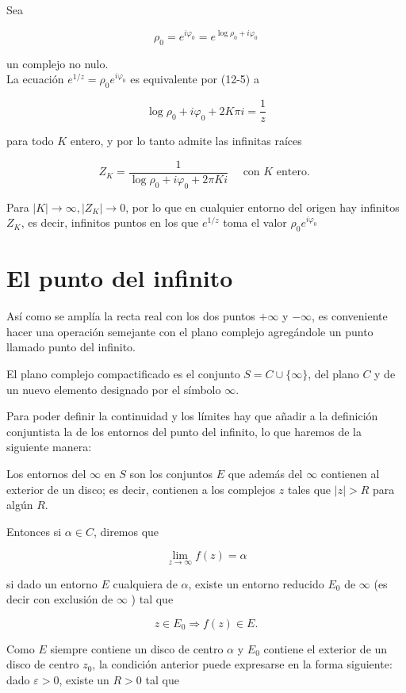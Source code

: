 \documentclass[10pt]{article}
\theoremstyle{plain}
\theoremstyle{definition}
\theoremstyle{remark}
\begin{document}
Sea

$$
\rho_{0}=e^{i \varphi_{0}}=e^{\log \rho_{0}+i \varphi_{0}}
$$

un complejo no nulo.\\
La ecuación $e^{1 / z}=\rho_{0} e^{i \varphi_{0}}$ es equivalente por (12-5) a

$$
\log \rho_{0}+i \varphi_{0}+2 K \pi i=\frac{1}{z}
$$

para todo $K$ entero, y por lo tanto admite las infinitas raíces

$$
Z_{K}=\frac{1}{\log \rho_{0}+i \varphi_{0}+2 \pi K i} \quad \text { con } K \text { entero. }
$$

Para $|K| \rightarrow \infty,\left|Z_{K}\right| \rightarrow 0$, por lo que en cualquier entorno del origen hay infinitos $Z_{K}$, es decir, infinitos puntos en los que $e^{1 / z}$ toma el valor $\rho_{0} e^{i \varphi_{0}}$

\section{El punto del infinito}
Así como se amplía la recta real con los dos puntos $+\infty$ y $-\infty$, es conveniente hacer una operación semejante con el plano complejo agregándole un punto llamado punto del infinito.

El plano complejo compactificado es el conjunto $S=C \cup\{\infty\}$, del plano $C$ y de un nuevo elemento designado por el símbolo $\infty$.

Para poder definir la continuidad y los límites hay que añadir a la definición conjuntista la de los entornos del punto del infinito, lo que haremos de la siguiente manera:

Los entornos del $\infty$ en $S$ son los conjuntos $E$ que además del $\infty$ contienen al exterior de un disco; es decir, contienen a los complejos $z$ tales que $|z|>R$ para algún $R$.

Entonces si $\alpha \in C$, diremos que

$$
\lim _{z \rightarrow \infty} f(z)=\alpha
$$

si dado un entorno $E$ cualquiera de $\alpha$, existe un entorno reducido $E_{0}$ de $\infty$ (es decir con exclusión de $\infty$ ) tal que

$$
z \in E_{0} \Rightarrow f(z) \in E .
$$

Como $E$ siempre contiene un disco de centro $\alpha$ y $E_{0}$ contiene el exterior de un disco de centro $z_{0}$, la condición anterior puede expresarse en la forma siguiente: dado $\varepsilon>0$, existe un $R>0$ tal que
\end{document}
